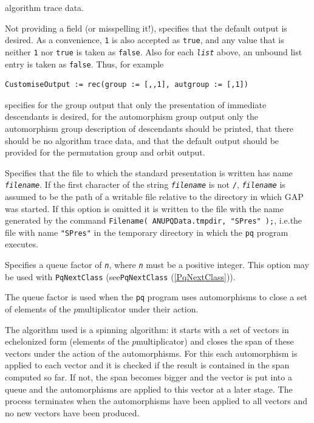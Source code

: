 \documentclass[a4paper,11pt]{report}
\begin{document}
{{\begin{description}
\begin{description}
algorithm trace data. 
\end{description}
 Not providing a field (or mis\texttt{}spelling it!), specifies that
the default output is desired. As a convenience, \texttt{1} is also accepted as \texttt{true}, and any value that is neither \texttt{1} nor \texttt{true} is taken as \texttt{false}. Also for each \mbox{\texttt{\mdseries\slshape list}} above, an unbound list entry is taken as \texttt{false}. Thus, for example 
\begin{Verbatim}[commandchars=!@|,fontsize=\small,frame=single,label=Example]
  CustomiseOutput := rec(group := [,,1], autgroup := [,1])
\end{Verbatim}
 specifies for the group output that only the presentation of immediate
descendants is desired, for the automorphism group output only the
automorphism group description of descendants should be printed, that there
should be no algorithm trace data, and that the default output should be
provided for the permutation group and orbit output. 
\item[{\texttt{StandardPresentationFile := \mbox{\texttt{\mdseries\slshape filename}}} \label{option StandardPresentationFile}\index{option StandardPresentationFile}}]  Specifies that the file to which the standard presentation is written has name \mbox{\texttt{\mdseries\slshape filename}}. If the first character of the string \mbox{\texttt{\mdseries\slshape filename}} is not \texttt{/}, \mbox{\texttt{\mdseries\slshape filename}} is assumed to be the path of a writable file relative to the directory in
which \textsf{GAP} was started. If this option is omitted it is written to the file with the name
generated by the command \texttt{Filename( ANUPQData.tmpdir, "SPres" );}, i.e.{\nobreakspace}the file with name \texttt{"SPres"} in the temporary directory in which the \texttt{pq} program executes. 
\item[{\texttt{QueueFactor := \mbox{\texttt{\mdseries\slshape n}}} \label{option QueueFactor}\index{option QueueFactor}}]  Specifies a queue factor of \mbox{\texttt{\mdseries\slshape n}}, where \mbox{\texttt{\mdseries\slshape n}} must be a positive integer. This option may be used with \texttt{PqNextClass} (see{\nobreakspace}\texttt{PqNextClass} (\ref{PqNextClass})). 

 The queue factor is used when the \texttt{pq} program uses automorphisms to close a set of elements of the $p$\texttt{}multiplicator under their action. 

 The algorithm used is a spinning algorithm: it starts with a set of vectors in
echelonized form (elements of the $p$\texttt{}multiplicator) and closes the span of these vectors under
the action of the automorphisms. For this each automorphism is applied to each
vector and it is checked if the result is contained in the span computed so
far. If not, the span becomes bigger and the vector is put into a queue and
the automorphisms are applied to this vector at a later stage. The process
terminates when the automorphisms have been applied to all vectors and no new
vectors have been produced. 


\end{description}}}
\end{document}

